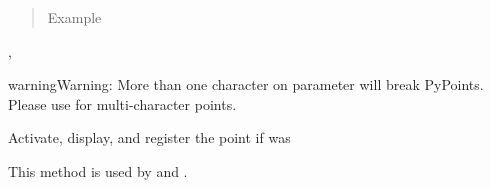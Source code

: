 \documentclass[letterpaper,10pt,english]{sphinxmanual}
\begin{document}
\begin{fulllineitems}
\begin{quote}
\begin{description}
\begin{itemize}
\end{itemize}

\item[{Example}] \leavevmode
\end{description}\end{quote}

\begin{sphinxVerbatim}[commandchars=\\\{\}]
      
\end{sphinxVerbatim}




{\hyperref[\detokenize{pypoints:pypoints.Font}]{}}, {\hyperref[\detokenize{pypoints:pypoints.Text}]{}}



\begin{sphinxadmonition}{warning}{Warning:}
More than one character on parameter  will break PyPoints. Please use {\hyperref[\detokenize{pypoints:pypoints.Text}]{}} for multi-character points.
\end{sphinxadmonition}

\begin{fulllineitems}
\label{\detokenize{pypoints:pypoints.Point.activate}}
Activate, display, and register the point if  was 

\end{fulllineitems}


\begin{fulllineitems}
\label{\detokenize{pypoints:pypoints.Point.draw}}
This method is used by {\hyperref[\detokenize{pypoints:pypoints.PointRegistry}]{}} and .


\end{fulllineitems}
\end{fulllineitems}
\end{document}
